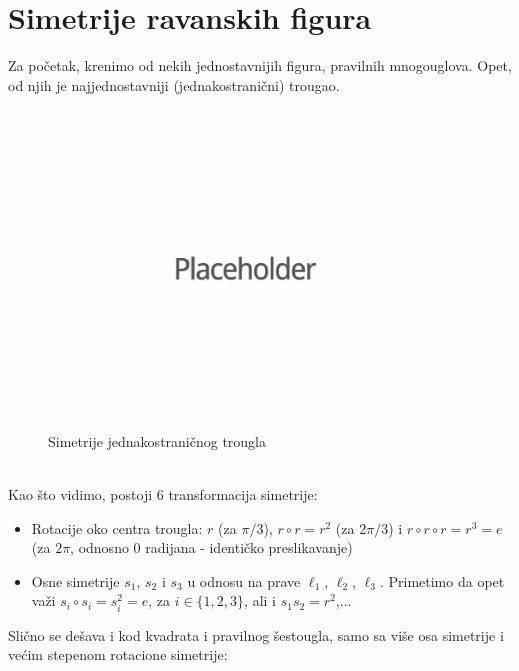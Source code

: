 \documentclass[times, utf8, diplomski]{fer}
\theoremstyle{plain}
\theoremstyle{definition}
\begin{document}
\section{Simetrije ravanskih figura}
Za po\v cetak, krenimo od nekih jednostavnijih figura, pravilnih mnogouglova. Opet, od njih je najjednostavniji (jednakostrani\v cni) trougao.\\
\begin{figure}[h]
\centering
\includegraphics{placeholder}
\caption{Simetrije jednakostrani\v cnog trougla}
\end{figure}\\
Kao \v sto vidimo, postoji 6 transformacija simetrije: \begin{itemize}
                                                         \item Rotacije oko centra trougla: $r$ (za $\pi/3$), $r\circ r = r^2$ (za $2\pi/3$) i $r\circ r \circ r = r^3 = e$ (za $2\pi$, odnosno $0$ radijana - identi\v cko preslikavanje)
                                                         \item Osne simetrije $s_1$, $s_2$ i $s_3$ u odnosu na prave $\ell_1$, $\ell_2$, $\ell_3$. Primetimo da opet va\v zi $s_i \circ s_i = s_i^2 = e$, za $i\in \lbrace 1, 2, 3 \rbrace$, ali i $s_1 s_2 = r^2$,...
                                                       \end{itemize}
Sli\v cno se de\v sava i kod kvadrata i pravilnog \v sestougla, samo sa vi\v se osa simetrije i ve\'cim stepenom rotacione simetrije:\\
\end{document}
